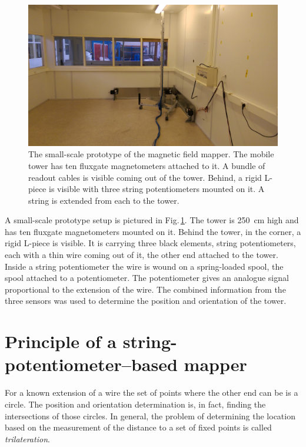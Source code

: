 \begin{figure}
  \centering
  \includegraphics[width=\linewidth]{gfx/mapping/lpsc/setup.jpg}
  \caption{The small-scale prototype of the magnetic field mapper. The mobile tower has ten fluxgate magnetometers attached to it. A bundle of readout cables is visible coming out of the tower. Behind, a rigid L-piece is visible with three string potentiometers mounted on it. A string is extended from each to the tower. }\label{fig:mapping_bastille_setup}
\end{figure}

A small-scale prototype setup is pictured in Fig.\,\ref{fig:mapping_bastille_setup}. The tower is \SI{250}{\centi\metre} high and has ten fluxgate magnetometers mounted on it. Behind the tower, in the corner, a rigid L-piece is visible. 
It is carrying three black elements, string potentiometers, each with a thin wire coming out of it, the other end attached to the tower. Inside a string potentiometer the wire is wound on a spring-loaded spool, the spool attached to a potentiometer.
The potentiometer gives an analogue signal proportional to the extension of the wire. The combined information from the three sensors was used to determine the position and orientation of the tower.



\section{Principle of a string-potentiometer--based mapper}
For a known extension of a wire the set of points where the other end can be is a circle. The position and orientation determination is, in fact, finding the intersections of those circles.
In general, the problem of determining the location based on the measurement of the distance to a set of fixed points is called \emph{trilateration}.

